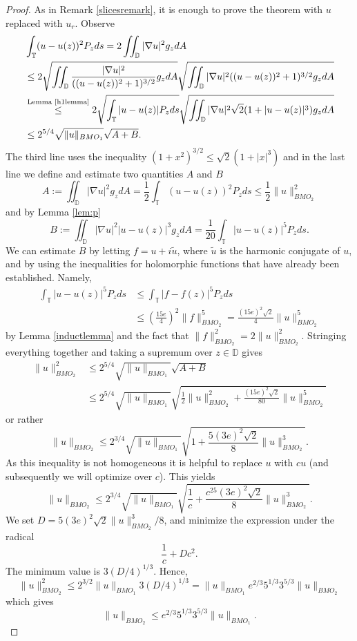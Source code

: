 \documentclass[12pt]{amsart}
\theoremstyle{definition}
\theoremstyle{remark}
\numberwithin{equation}{section}
\newcommand{\D}{\mathbb{D}}
\newcommand{\T}{\mathbb{T}}
\begin{document}
\begin{proof}
As in Remark \ref{slicesremark}, it is enough to prove the theorem
with $u$ replaced with $u_r$. Observe
\[
\begin{aligned}
&\int_{\T} (u-u(z))^2P_z ds  = 2 \iint_{\D} |\nabla u|^2 g_z dA \\
&\leq 
 2 \sqrt{\iint_{\D} \frac{|\nabla u|^2}{((u-u(z))^2+1)^{3/2}} g_z
  dA} \sqrt{\iint_{\D} |\nabla u|^2 ((u-u(z))^2+1)^{3/2} g_z dA} \\
&\overset{\text{Lemma \ref{h1lemma}}}{\leq}  2 \sqrt{\int_{\T}|u-u(z)|P_z ds} \sqrt{\iint_{\D}
  |\nabla u|^2\sqrt{2}(1+|u-u(z)|^3) g_z dA} \\
&\leq 2^{5/4}\sqrt{\|u\|_{BMO_1}} \sqrt{A+B}.
\end{aligned}
\]
The third line uses the inequality $(1+x^2)^{3/2} \leq
\sqrt{2}(1+|x|^{3})$ and in the last line we define and estimate two
quantities $A$ and $B$
\[
A:= \iint_{\D} |\nabla u|^2 g_z dA = \frac{1}{2}\int_{\T} (u-u(z))^2P_z ds
\leq \frac{1}{2} \|u\|^2_{BMO_2}
\]
and by Lemma \ref{lem:p}
\[
B:= \iint_{\D} |\nabla u|^2|u-u(z)|^3 g_z dA = \frac{1}{20} \int_{\T}
|u-u(z)|^5P_z ds.
\]
We can estimate $B$ by letting $f = u+i\tilde{u}$, where $\tilde{u}$
is the harmonic conjugate of $u$, and by using the inequalities for
holomorphic functions that have already been established.  Namely,
\[
\begin{aligned}
\int_{\T}
|u-u(z)|^5P_z ds &\leq \int_{\T} |f-f(z)|^5 P_z ds \\
&\leq
(\frac{15e}{4})^2 \|f\|^5_{BMO_2} 
= \frac{(15e)^2\sqrt{2}}{4} \|u\|^5_{BMO_2}
\end{aligned}
\]
by Lemma \ref{inductlemma} and the fact that $\|f\|^2_{BMO_2} =
2\|u\|^2_{BMO_2}$. Stringing everything together and taking a supremum
over $z \in \D$ gives
\[
\begin{aligned}
\|u\|^2_{BMO_2} &\leq 2^{5/4} \sqrt{\|u\|_{BMO_1}} \sqrt{A+B} \\ &\leq
2^{5/4} \sqrt{\|u\|_{BMO_1}}\sqrt{\frac{1}{2}\|u\|^2_{BMO_2} +
\frac{(15e)^2\sqrt{2}}{80} \|u\|^5_{BMO_2}}
\end{aligned}
\]
or rather
\[
\|u\|_{BMO_2} \leq 2^{3/4} \sqrt{\|u\|_{BMO_1}}\sqrt{1 + \frac{5(3e)^2\sqrt{2}}{8}\|u\|^3_{BMO_2}}.
\]
As this inequality is not homogeneous it is helpful to replace $u$
with $cu$ (and subsequently we will optimize over $c$). This yields
\[
\|u\|_{BMO_2} \leq 2^{3/4} \sqrt{\|u\|_{BMO_1}}\sqrt{\frac{1}{c} +
  \frac{c^25(3e)^2\sqrt{2}}{8}\|u\|^3_{BMO_2}}.
\]
We set $D = 5(3e)^2\sqrt{2}\|u\|^3_{BMO_2}/8$, and minimize the
expression under the radical
\[
\frac{1}{c} + Dc^2.
\]
The minimum value is $3(D/4)^{1/3}$. Hence,
\[
\|u\|^2_{BMO_2} \leq 2^{3/2} \|u\|_{BMO_1} 3 (D/4)^{1/3} =\|u\|_{BMO_1}
e^{2/3}5^{1/3}3^{5/3}\|u\|_{BMO_2}
\]
which gives
\[
\|u\|_{BMO_2} \leq
e^{2/3}5^{1/3}3^{5/3}\|u\|_{BMO_1}.
\]
\end{proof}
\end{document}
